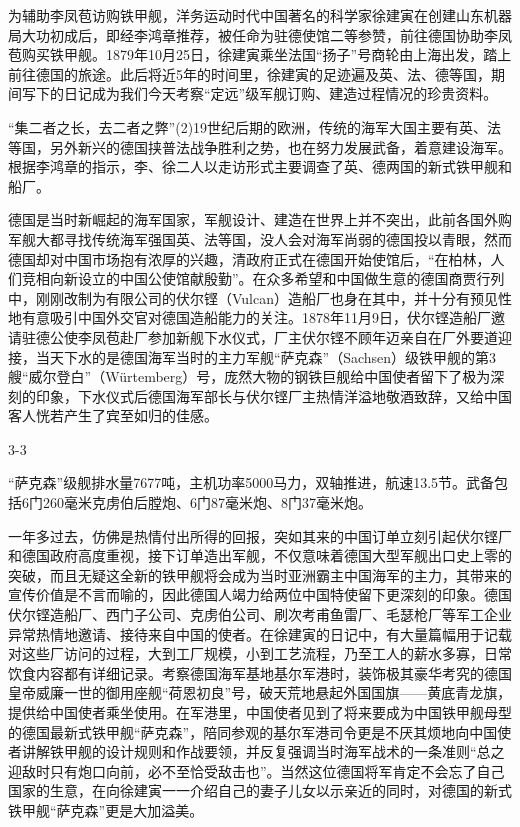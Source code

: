 \documentclass[12pt,UTF8]{ctexbook}
\begin{document}
为辅助李凤苞访购铁甲舰，洋务运动时代中国著名的科学家徐建寅在创建山东机器局大功初成后，即经李鸿章推荐，被任命为驻德使馆二等参赞，前往德国协助李凤苞购买铁甲舰。1879年10月25日，徐建寅乘坐法国“扬子”号商轮由上海出发，踏上前往德国的旅途。此后将近5年的时间里，徐建寅的足迹遍及英、法、德等国，期间写下的日记成为我们今天考察“定远”级军舰订购、建造过程情况的珍贵资料。

“集二者之长，去二者之弊”(2)19世纪后期的欧洲，传统的海军大国主要有英、法等国，另外新兴的德国挟普法战争胜利之势，也在努力发展武备，着意建设海军。根据李鸿章的指示，李、徐二人以走访形式主要调查了英、德两国的新式铁甲舰和船厂。

德国是当时新崛起的海军国家，军舰设计、建造在世界上并不突出，此前各国外购军舰大都寻找传统海军强国英、法等国，没人会对海军尚弱的德国投以青眼，然而德国却对中国市场抱有浓厚的兴趣，清政府正式在德国开始使馆后，“在柏林，人们竞相向新设立的中国公使馆献殷勤”。在众多希望和中国做生意的德国商贾行列中，刚刚改制为有限公司的伏尔铿（Vulcan）造船厂也身在其中，并十分有预见性地有意吸引中国外交官对德国造船能力的关注。1878年11月9日，伏尔铿造船厂邀请驻德公使李凤苞赴厂参加新舰下水仪式，厂主伏尔铿不顾年迈亲自在厂外要道迎接，当天下水的是德国海军当时的主力军舰“萨克森”（Sachsen）级铁甲舰的第3艘“威尔登白”（Würtemberg）号，庞然大物的钢铁巨舰给中国使者留下了极为深刻的印象，下水仪式后德国海军部长与伏尔铿厂主热情洋溢地敬酒致辞，又给中国客人恍若产生了宾至如归的佳感。

3-3

“萨克森”级舰排水量7677吨，主机功率5000马力，双轴推进，航速13.5节。武备包括6门260毫米克虏伯后膛炮、6门87毫米炮、8门37毫米炮。

一年多过去，仿佛是热情付出所得的回报，突如其来的中国订单立刻引起伏尔铿厂和德国政府高度重视，接下订单造出军舰，不仅意味着德国大型军舰出口史上零的突破，而且无疑这全新的铁甲舰将会成为当时亚洲霸主中国海军的主力，其带来的宣传价值是不言而喻的，因此德国人竭力给两位中国特使留下更深刻的印象。德国伏尔铿造船厂、西门子公司、克虏伯公司、刷次考甫鱼雷厂、毛瑟枪厂等军工企业异常热情地邀请、接待来自中国的使者。在徐建寅的日记中，有大量篇幅用于记载对这些厂访问的过程，大到工厂规模，小到工艺流程，乃至工人的薪水多寡，日常饮食内容都有详细记录。考察德国海军基地基尔军港时，装饰极其豪华考究的德国皇帝威廉一世的御用座舰“荷恩初良”号，破天荒地悬起外国国旗——黄底青龙旗，提供给中国使者乘坐使用。在军港里，中国使者见到了将来要成为中国铁甲舰母型的德国最新式铁甲舰“萨克森”，陪同参观的基尔军港司令更是不厌其烦地向中国使者讲解铁甲舰的设计规则和作战要领，并反复强调当时海军战术的一条准则“总之迎敌时只有炮口向前，必不至恰受敌击也”。当然这位德国将军肯定不会忘了自己国家的生意，在向徐建寅一一介绍自己的妻子儿女以示亲近的同时，对德国的新式铁甲舰“萨克森”更是大加溢美。
\end{document}
